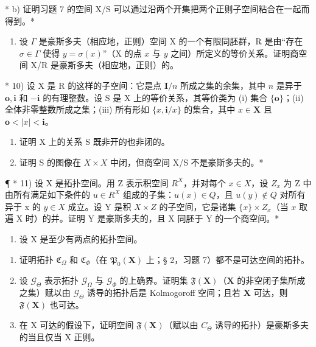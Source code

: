 * b) 证明习题 7 的空间 X/S 可以通过沿两个开集把两个正则子空间粘合在一起而得到。*

\begin{enumerate}
\def\labelenumi{\arabic{enumi})}
\setcounter{enumi}{8}
\tightlist
\item
  设 \(\Gamma\) 是豪斯多夫（相应地，正则）空间 X 的一个有限同胚群，R 是由“存在 \(\sigma \in \Gamma\) 使得 \(y = \sigma(x)\)”（X 的点 \(x\) 与 \(y\) 之间）所定义的等价关系。证明商空间 X/R 是豪斯多夫（相应地，正则）的。
\end{enumerate}

* 10) 设 X 是 R 的这样的子空间：它是点 \(\mathbf{I} / n\) 所成之集的余集，其中 \(n\) 是异于 \(\mathbf{o}, \mathbf{i}\) 和 \(-\mathbf{i}\) 的有理整数。设 S 是 X 上的等价关系，其等价类为 (i) 集合 \(\{\mathbf{o}\}\)；(ii) 全体非零整数所成之集；(iii) 所有形如 \(\{x, \mathbf{i} / x\}\) 的集合，其中 \(x \in \mathbf{X}\) 且 \(\mathbf{o} < |x| < \mathbf{i}\)。

\begin{enumerate}
\def\labelenumi{\alph{enumi})}
\item
  证明 X 上的关系 S 既非开的也非闭的。
\item
  证明 S 的图像在 \(X \times X\) 中闭，但商空间 X/S 不是豪斯多夫的。*
\end{enumerate}

¶ * 11) 设 X 是拓扑空间。用 Z 表示积空间 \(R^{X}\)，并对每个 \(x \in X\)，设 \(Z_{x}\) 为 Z 中由所有满足如下条件的 \(u \in R^{X}\) 组成的子集：\(u(x) \in Q\)，且 \(u(y) \notin Q\) 对所有异于 x 的 \(y \in X\) 成立。设 Y 是积 \(X \times Z\) 的子空间，它是诸集 \(\{x\} \times Z_x\)（当 \(x\) 取遍 X 时）的并。证明 Y 是豪斯多夫的，且 X 同胚于 Y 的一个商空间。*

\begin{enumerate}
\def\labelenumi{\arabic{enumi})}
\setcounter{enumi}{11}
\tightlist
\item
  设 X 是至少有两点的拓扑空间。
\end{enumerate}

\begin{enumerate}
\def\labelenumi{\alph{enumi})}
\item
  证明拓扑 \(\mathfrak{C}_{\Omega}\) 和 \(\mathfrak{C}_{\Phi}\)（在 \(\mathfrak{P}_0(\mathbf{X})\) 上；§ 2，习题 7）都不是可达空间的拓扑。
\item
  设 \(\mathcal{G}_{\Theta}\) 表示拓扑 \(\mathcal{G}_{\Omega}\) 与 \(\mathcal{G}_{\Phi}\) 的上确界。证明集 \(\mathfrak{F}(\mathbf{X})\)（\(\mathbf{X}\) 的非空闭子集所成之集）赋以由 \(\mathcal{G}_{\Theta}\) 诱导的拓扑后是 Kolmogoroff 空间；且若 \(\mathbf{X}\) 可达，则 \(\mathfrak{F}(\mathbf{X})\) 也可达。
\item
  在 X 可达的假设下，证明空间 \(\mathfrak{F}(\mathbf{X})\)（赋以由 \(C_{\Theta}\) 诱导的拓扑）是豪斯多夫的当且仅当 X 正则。
\end{enumerate}


